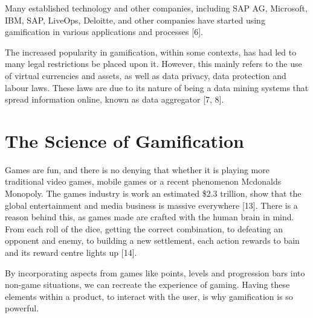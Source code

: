 		Many established technology and other companies, including SAP AG, Microsoft, IBM, SAP, LiveOps, Deloitte, and other companies have started using gamification in various applications and processes [6].
		
		The increased popularity in gamification, within some contexts, has had led to many legal restrictions be placed upon it. However, this mainly refers to the use of virtual currencies and assets, as well as data privacy, data protection and labour laws. These laws are due to its nature of being a data mining systems that spread information online, known as data aggregator [7, 8].

	\section{The Science of Gamification}
		\label{sec:google_fu}
		
		Games are fun, and there is no denying that whether it is playing more traditional video games, mobile games or a recent phenomenon Mcdonalds Monopoly. The games industry is work an estimated \$2.3 trillion, show that the global entertainment and media business is massive everywhere [13]. There is a reason behind this, as games made are crafted with the human brain in mind. From each roll of the dice, getting the correct combination, to defeating an opponent and enemy, to building a new settlement, each action rewards to bain and its reward centre lights up [14].
		
		By incorporating aspects from games like points, levels and progression bars into non-game situations, we can recreate the experience of gaming. Having these elements within a product, to interact with the user, is why gamification is so powerful.
		
